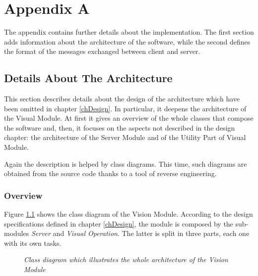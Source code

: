 \appendix
\chapter{Appendix A}
	The appendix contains further details about the implementation.
	The first section adds information about the architecture of the software, while the second defines the format of the messages exchanged between client and server.	
			

	\section{Details About The Architecture} \label{appA}
		This section describes details about the design of the architecture which have been omitted in chapter \ref{chDesign}.
		In particular, it deepens the architecture of the Visual Module.
		At first it gives an overview of the whole classes that compose the software and, then, it focuses on the aspects not described in the design chapter: the architecture of the Server Module and of the Utility Part of Visual Module.
		
		
		Again the description is helped by class diagrams. 
		This time, such diagrams are obtained from the source code thanks to a tool of reverse engineering.
	
		\subsection{Overview}\label{impl_arch}
		Figure \ref{fig:implementation_names} shows the class diagram of the Vision Module. 
		According to the design specifications defined in chapter \ref{chDesign}, the module is composed by the sub-modules \emph{Server} and \emph{Visual Operation}. 
		The latter is split in three parts, each one with its own tasks.

		\begin{figure}[h]
		  \begin{center} 
		  \end{center} 
		  \caption{\textit{Class diagram which illustrates the whole architecture of the Vision Module}}  
		  \label{fig:implementation_names}
	 	\end{figure}
 
